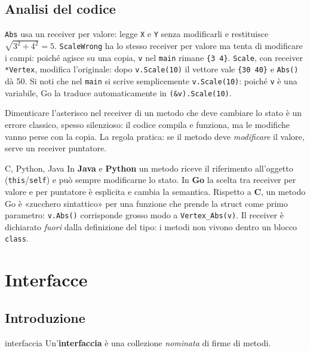 \documentclass[11pt,a4paper]{report}
\newcommand{\cod}[1]{\texttt{#1}}
\begin{document}
\subsection{Analisi del codice}

\cod{Abs} usa un receiver per valore: legge \cod{X} e \cod{Y} senza modificarli
e restituisce $\sqrt{3^2+4^2}=5$. \cod{ScaleWrong} ha lo stesso receiver per
valore ma tenta di modificare i campi: poiché agisce su una copia, \cod{v} nel
\cod{main} rimane \cod{\{3 4\}}. \cod{Scale}, con receiver \cod{*Vertex},
modifica l'originale: dopo \cod{v.Scale(10)} il vettore vale \cod{\{30 40\}} e
\cod{Abs()} dà 50. Si noti che nel \cod{main} si scrive semplicemente
\cod{v.Scale(10)}: poiché \cod{v} è una variabile, Go la traduce
automaticamente in \cod{(\&v).Scale(10)}.

\begin{attenzione}
Dimenticare l'asterisco nel receiver di un metodo che deve cambiare lo stato è
un errore classico, spesso silenzioso: il codice compila e funziona, ma le
modifiche vanno perse con la copia. La regola pratica: se il metodo deve
\emph{modificare} il valore, serve un receiver puntatore.
\end{attenzione}

\begin{confronto}{C, Python, Java}
In \textbf{Java} e \textbf{Python} un metodo riceve il riferimento all'oggetto
(\cod{this}/\cod{self}) e può sempre modificarne lo stato. In \textbf{Go} la
scelta tra receiver per valore e per puntatore è esplicita e cambia la
semantica. Rispetto a \textbf{C}, un metodo Go è «zucchero sintattico» per una
funzione che prende la struct come primo parametro: \cod{v.Abs()} corrisponde
grosso modo a \cod{Vertex\_Abs(v)}. Il receiver è dichiarato \emph{fuori} dalla
definizione del tipo: i metodi non vivono dentro un blocco \cod{class}.
\end{confronto}

\section{Interfacce}\label{sec:interfacce}

\subsection{Introduzione}

\begin{definizione}{interfaccia}
Un'\textbf{interfaccia} è una collezione \emph{nominata} di firme di metodi.
\end{definizione}
\end{document}
